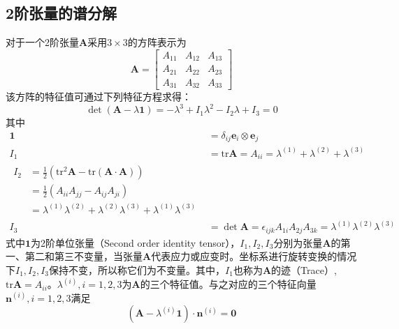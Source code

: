 \subsection{2阶张量的谱分解}\label{spectral}
对于一个2阶张量$\boldsymbol A$采用$3\times3$的方阵表示为
\begin{equation}
\boldsymbol A = \begin{bmatrix}
    A_{11} & A_{12} & A_{13} \\
    A_{21} & A_{22} & A_{23} \\
    A_{31} & A_{32} & A_{33}
\end{bmatrix}
\end{equation}
该方阵的特征值可通过下列特征方程求得：
\begin{equation}
    \det(\boldsymbol A - \lambda \boldsymbol 1) = - \lambda^3 + I_1 \lambda^2 - I_2 \lambda + I_3 = 0
\end{equation}
其中
\begin{align}
    \boldsymbol 1 &= \delta_{ij} \boldsymbol e_i \otimes \boldsymbol e_j \\
    I_1 &= \mathrm{tr} \boldsymbol A = A_{ii} = \lambda^{(1)} + \lambda^{(2)} + \lambda^{(3)}\label{ch_introduction:invarant1} \\
    \begin{split}\label{ch_introduction:invarant2}
    I_2 &= \frac{1}{2}(\mathrm{tr}^2 \boldsymbol A - \mathrm{tr}(\boldsymbol A \cdot \boldsymbol A)) \\
        &= \frac{1}{2}(A_{ii} A_{jj} - A_{ij} A_{ji}) \\
        &= \lambda^{(1)} \lambda^{(2)} + \lambda^{(2)} \lambda^{(3)} + \lambda^{(1)} \lambda^{(3)}
    \end{split} \\
    I_3 &= \det \boldsymbol A = \epsilon_{ijk} A_{1i} A_{2j} A_{3k} = \lambda^{(1)} \lambda^{(2)} \lambda^{(3)}\label{ch_introduction:invarant3}
\end{align}
式中$\boldsymbol 1$为2阶单位张量（Second order identity tensor），$I_1, I_2, I_3$分别为张量$\boldsymbol A$的第一、第二和第三不变量，当张量$\boldsymbol A$代表应力或应变时。坐标系进行旋转变换的情况下$I_1, I_2, I_3$保持不变，所以称它们为不变量。其中，$I_1$也称为$\boldsymbol A$的迹（Trace）, $\mathrm{tr}\boldsymbol A = A_{ii}$。$\lambda^{(i)}, i=1,2,3$为$\boldsymbol A$的三个特征值。与之对应的三个特征向量$\boldsymbol n^{(i)}, i=1,2,3$满足
\begin{equation}
    (\boldsymbol A - \lambda^{(i)}\boldsymbol 1) \cdot \boldsymbol n^{(i)} = \boldsymbol 0
\end{equation}\par
